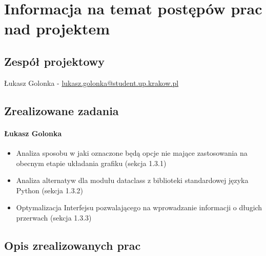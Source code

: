 \documentclass[12pt,a4paper,oneside]{article}
\theoremstyle{definition}
\numberwithin{equation}{section}
\begin{document}
\tableofcontents


\newpage

\section{Informacja na temat postępów prac nad projektem}
\subsection{Zespół projektowy}
Łukasz Golonka - \href{mailto:lukasz.golonka@student.up.krakow.pl}{lukasz.golonka@student.up.krakow.pl}
\subsection{Zrealizowane zadania}
\paragraph{Łukasz Golonka}
\begin{itemize}
\item Analiza sposobu w jaki oznaczone będą opcje nie mające zastosowania na obecnym etapie układania grafiku (sekcja 1.3.1)
\item Analiza alternatyw dla modułu dataclass z biblioteki standardowej języka Python (sekcja 1.3.2)
\item Optymalizacja Interfejsu pozwalającego na wprowadzanie informacji o długich przerwach (sekcja 1.3.3)
\end{itemize}

\subsection {Opis zrealizowanych prac}
\end{document}
